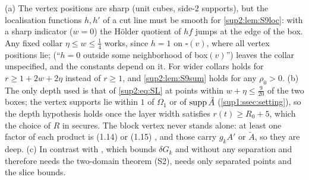 \begin{remark}\label{sup2:rem:S9}
\textup{(a)} The vertex positions are sharp (unit cubes, side-$2$ supports), but the localisation functions $h,h'$ of a cut line must be smooth for \cref{sup2:lem:S9loc}: with a sharp indicator ($w=0$) the H\"older quotient of $hf$ jumps at the edge of the box. Any fixed collar $\eta\le w\le\frac14$ works, since $h=1$ on $\square(v)$, where all vertex positions lie; \cite[p.~420]{Ba3} (``$h=0$ outside some neighborhood of box$(v)$'') leaves the collar unspecified, and the constants depend on it. For wider collars \cite[(3.1)]{Ba3} holds for $r\ge1+2w+2\eta$ instead of $r\ge1$, and \cref{sup2:lem:S9sum} holds for any $\rho_0>0$. \textup{(b)} The only depth used is that of \eqref{sup2:eq:SL} at points within $w+\eta\le\frac9{20}$ of the two boxes; the vertex supports lie within $1$ of $\Omega_1$ or of $\operatorname{supp}\tilde A$ (\cref{sup1:ssec:setting}), so the depth hypothesis holds once the layer width satisfies $r(t)\ge R_0+5$, which the choice of $R$ in \cite[(2.7)]{Ba2} secures. The block vertex \cite[(1.13)]{Ba3} never stands alone: at least one factor of each product \cite[(1.18)]{Ba3} is (1.14) or (1.15) \cite[p.~414]{Ba3}, and those carry $g_kA'$ or $\tilde A$, so they are deep. \textup{(c)} In contrast with \cite[(2.5)]{Ba3}, which bounds $\delta G_k$ and \cite[(1.16)]{Ba3} without any separation and therefore needs the two-domain theorem (S2), \cite[(3.1)]{Ba3} needs only separated points and the slice bounds.
\end{remark}
